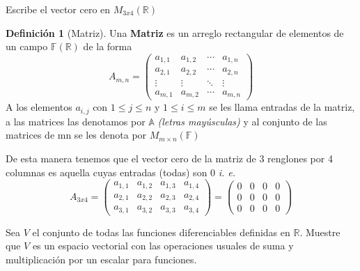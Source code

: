 \documentclass[letterpaper]{article}
\newcommand{\F}{\mathds{F}}
\newcommand{\R}{\mathds{R}}
\renewcommand{\*}{\cdot}
\theoremstyle{definition}
\newtheorem{definition}{Definición}
\begin{document}
	
\begin{ejercicio}{1}
	Escribe el vector cero en $M_{3x4}(\mathbb{R})$
\end{ejercicio}
		\begin{definition}[Matriz]
		Una \textbf{Matriz} es un arreglo rectangular de elementos de un campo $ \F(\R) $ de la forma
		\begin{equation*}
		A_{m,n} = 
		\begin{pmatrix}
		a_{1,1} & a_{1,2} & \cdots & a_{1,n} \\
		a_{2,1} & a_{2,2} & \cdots & a_{2,n} \\
		\vdots  & \vdots  & \ddots & \vdots  \\
		a_{m,1} & a_{m,2} & \cdots & a_{m,n} 
		\end{pmatrix}
		\end{equation*}
		A los elementos $ a_{i,j} $ con $ 1 \leq j \leq n $ y $ 1 \leq i \leq m $ se les llama entradas de la matriz, a las matrices las denotamos por $ \mathds{A} $ 				\textit{(letras mayúsculas)} y al conjunto de las matrices de mn se les denota por $ M_{m\times n}(\F) $
		
	\end{definition}
	De esta manera tenemos que el vector cero de la matriz de 3 renglones por 4 columnas es aquella cuyas entradas (todas) son 0 \textit{i. e. }
		\begin{equation*}
		A_{3x4} = 
		\begin{pmatrix}
		a_{1,1} & a_{1,2} & a_{1,3} & a_{1,4} \\
		a_{2,1} & a_{2,2} & a_{2,3} & a_{2,4} \\
		a_{3,1} & a_{3,2} & a_{3,3} & a_{3,4} 
		\end{pmatrix}
		= 
		\begin{pmatrix}
		0 & 0 & 0 & 0\\
		0 & 0 & 0 & 0 \\
		0 & 0 & 0 & 0
		\end{pmatrix}
		\end{equation*}
		
\begin{ejercicio}{2}
 Sea $V$ el conjunto de todas las funciones diferenciables definidas en $\mathbb{R}$. Muestre que $V$ es un espacio vectorial con las operaciones usuales de suma y multiplicación por un escalar para funciones. 
\end{ejercicio}
\end{document}
